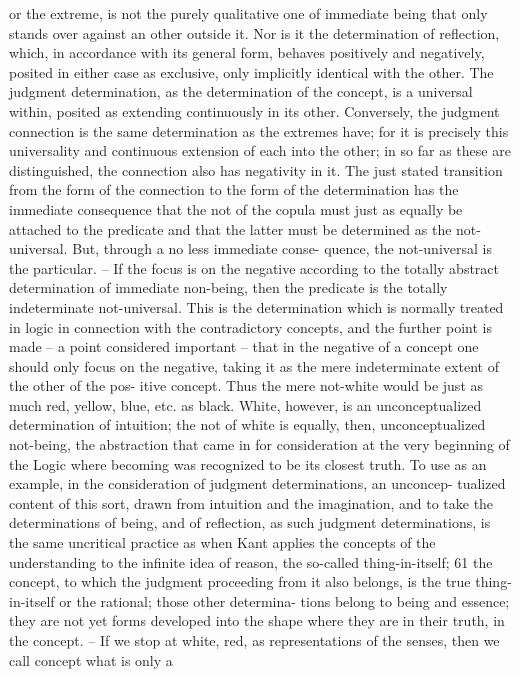 or the extreme, is not the purely qualitative one of immediate being that
only stands over against an other outside it. Nor is it the determination of
reflection, which, in accordance with its general form, behaves positively
and negatively, posited in either case as exclusive, only implicitly identical
with the other. The judgment determination, as the determination of the
concept, is a universal within, posited as extending continuously in its other.
Conversely, the judgment connection is the same determination as the
extremes have; for it is precisely this universality and continuous extension
of each into the other; in so far as these are distinguished, the connection
also has negativity in it.
The just stated transition from the form of the connection to the form of
the determination has the immediate consequence that the not of the copula
must just as equally be attached to the predicate and that the latter must be
determined as the not-universal. But, through a no less immediate conse-
quence, the not-universal is the particular. – If the focus is on the negative
according to the totally abstract determination of immediate non-being,
then the predicate is the totally indeterminate not-universal. This is the
determination which is normally treated in logic in connection with the
contradictory concepts, and the further point is made – a point considered
important – that in the negative of a concept one should only focus on the
negative, taking it as the mere indeterminate extent of the other of the pos-
itive concept. Thus the mere not-white would be just as much red, yellow,
blue, etc. as black. White, however, is an unconceptualized determination
of intuition; the not of white is equally, then, unconceptualized not-being,
the abstraction that came in for consideration at the very beginning of the
Logic where becoming was recognized to be its closest truth. To use as an
example, in the consideration of judgment determinations, an unconcep-
tualized content of this sort, drawn from intuition and the imagination,
and to take the determinations of being, and of reflection, as such judgment
determinations, is the same uncritical practice as when Kant applies the
concepts of the understanding to the infinite idea of reason, the so-called
thing-in-itself; 61 the concept, to which the judgment proceeding from it also
belongs, is the true thing-in-itself or the rational; those other determina-
tions belong to being and essence; they are not yet forms developed into the
shape where they are in their truth, in the concept. – If we stop at white,
red, as representations of the senses, then we call concept what is only a
